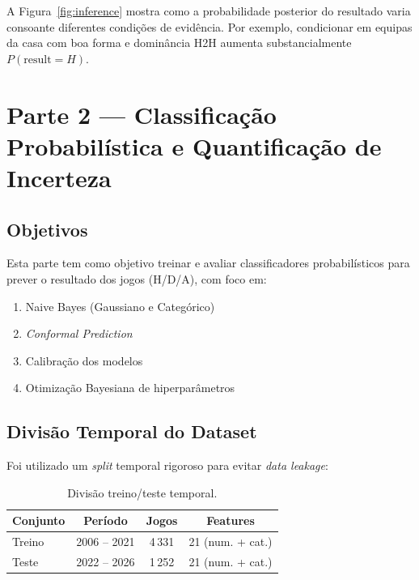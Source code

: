 \documentclass[12pt, a4paper]{article}
\begin{document}
A Figura~\ref{fig:inference} mostra como a probabilidade posterior do resultado varia consoante diferentes condições de evidência. Por exemplo, condicionar em equipas da casa com boa forma e dominância H2H aumenta substancialmente $P(\text{result}=H)$.

\section{Parte 2 --- Classificação Probabilística e Quantificação de Incerteza}

\subsection{Objetivos}

Esta parte tem como objetivo treinar e avaliar classificadores probabilísticos para prever o resultado dos jogos (H/D/A), com foco em:
\begin{enumerate}
  \item Naive Bayes (Gaussiano e Categórico)
  \item \textit{Conformal Prediction}
  \item Calibração dos modelos
  \item Otimização Bayesiana de hiperparâmetros
\end{enumerate}

\subsection{Divisão Temporal do Dataset}

Foi utilizado um \textit{split} temporal rigoroso para evitar \textit{data leakage}:

\begin{table}[H]
  \centering
  \caption{Divisão treino/teste temporal.}
  \begin{tabular}{lccc}
    \toprule
    \textbf{Conjunto} & \textbf{Período} & \textbf{Jogos} & \textbf{Features} \\
    \midrule
    Treino   & 2006 -- 2021 & 4\,331 & 21 (num. + cat.) \\
    Teste    & 2022 -- 2026 & 1\,252 & 21 (num. + cat.) \\
    \bottomrule
  \end{tabular}
  \label{tab:split}
\end{table}
\end{document}
